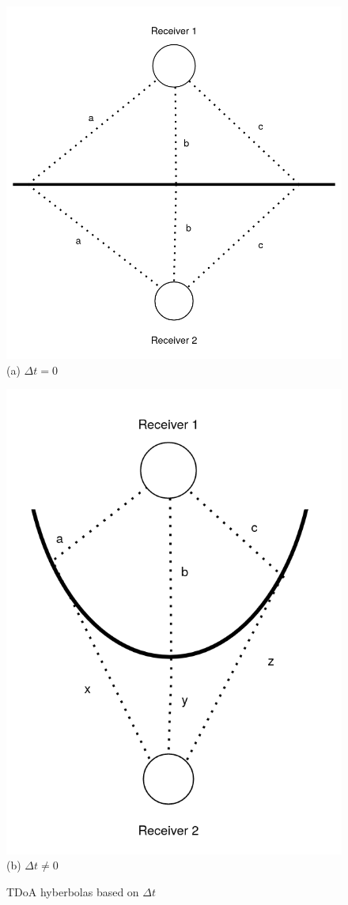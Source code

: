 \begin{figure} [H]
	\centering
    \begin{minipage}{.5\textwidth}
      \centering
      \includegraphics[width=0.7\linewidth]{../Photos/tdoa-dt-0.png}\\
      {(a) $Δt = 0$}
    \end{minipage}%
    \begin{minipage}{.5\textwidth}
      \centering
      \includegraphics[width=0.5\linewidth]{../Photos/tdoa-dt-not-0.png}\\
      {(b) $Δt \neq 0$}
	\end{minipage}
    \hfill \break
    \decoRule
    \caption[TDoA hyberbolas based on $\Delta t$]{TDoA hyberbolas based on $\Delta t$}
    \label{fig:TDoA-hyberbolas}
\end{figure}

